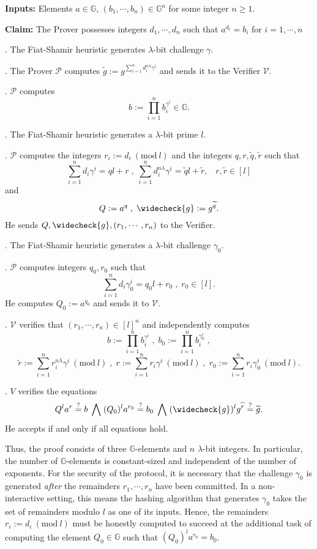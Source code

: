 \documentclass[11pt, lettersize, notitlepage, leqno, footskip=0.6cm]{article}
\newcommand{\slim}{\sum\limits}
\newcommand{\wti}{\widetilde}
\newcommand{\mc}{\mathcal}
\newcommand{\mb}{\mathbb}
\newcommand{\lam}{\lambda}
\newcommand{\lamb}{\lambda}
\newcommand{\weck}{\widecheck}
\newcommand{\mP}{\mc{P}}
\newcommand{\V}{\mc{V}}
\newcommand{\vs}{\vspace{-0.15cm}}
\newcommand{\noin}{\noindent}
\newcommand{\sta}{\stackrel{?}{=}}
\newcommand{\Mod}[1]{\ (\mathrm{mod}\ #1)}
\numberwithin{equation}{section}
\begin{document}
\noindent \textbf{Inputs:} Elements $a\in\mb{G} $, $(b_1,\cdots,b_n)\in \mb{G}^n$ for some integer $n\geq 1$.

\noindent \textbf{Claim:} The Prover possesses integers $d_1,\cdots, d_n$ such that $a^{d_i} = b_i$ for $i = 1,\cdots, n$

\begin{prf1} . The Fiat-Shamir heuristic generates $\lamb$-bit challenge $\gamma$.

\noin 2. The Prover $\mc{P}$ computes $\wti{g}:= g^{\sum\limits_{i=1}^n d_i^{n\lam}\gamma^i}$ and sends it to the Verifier $\mc{V}$.

. $\mc{P}$ computes \vs $$b:= \prod\limits_{i=1}^n b_i^{\gamma^i} \in \mb{G}.$$

\noin 4. The Fiat-Shamir heuristic generates a $\lam$-bit prime $l$. 

. $\mc{P}$ computes the integers $r_i:= d_i\Mod{l}$ and the integers $q, r,\wti{q},\wti{r}$ such that \vs $$\slim_{i=1}^n d_i\gamma^i = ql+r\;,\; \slim_{i=1}^n d_i^{n\lam}\gamma^i = \wti{q}l+\wti{r},\;\;\;r,\wti{r}\in[l]$$ and \vs $$Q:= a^q\;,\; \weck{g}:= g^{\wti{q}}.$$ He sends $Q, \weck{g}, (r_1,\cdots,r_n)$ to the Verifier.

\noin 6. The Fiat-Shamir heuristic generates a $\lam$-bit challenge $\gamma_0$.

\noin 7. $\mP$ computes integers $q_0, r_0$ such that \vs $$\slim_{i=1}^n d_i\gamma_0^i = q_0l+r_0\;,\;r_0\in[l] .$$ He computes $Q_0:= a^{q_0}$ and sends it to $\V.$

. $\mc{V}$ verifies that $(r_1,\cdots,r_n)\in [l]^n$ and independently computes \vs $$b := \prod\limits_{i=1}^n b_i^{\gamma^i}\;,\;b_0 := \prod\limits_{i=1}^n b_i^{\gamma_0^i}\;,$$ \vspace{-0.2cm} $$\wti{r}:= \slim_{i=1}^n r_i^{n\lam}\gamma^i\Mod{l}\;,\;r:= \slim_{i=1}^n r_i\gamma^i\Mod{l}\;,\;r_0:=\slim_{i=1}^n r_i\gamma_0^i\Mod{l}.$$ 

\noin 9. $V$ verifies the equations \vs $$Q^la^r\sta b\;\bigwedge\;(Q_0)^la^{r_0}\sta b_0\;\bigwedge\; (\weck{g})^lg^{\wti{r}}\sta\wti{g}.$$ He accepts if and only if all equations hold.\end{prf1}

Thus, the proof consists of three $\mb{G}$-elements and $n$ $\lam$-bit integers. In particular, the number of $\mb{G}$-elements is constant-sized and independent of the number of exponents. For the security of the protocol, it is necessary that the challenge $\gamma_0$ is generated \textit{after} the remainders $r_1,\cdots,r_n$ have been committed. In a non-interactive setting, this means the hashing algorithm that generates $\gamma_0$ takes the set of remainders modulo $l$ as one of its inputs. Hence, the remainders $r_i:= d_i\Mod{l}$ must be honestly computed to succeed at the additional task of computing the element $Q_0\in\mb{G}$ such that $(Q_0)^la^{r_0} = b_0$.
\end{document}
